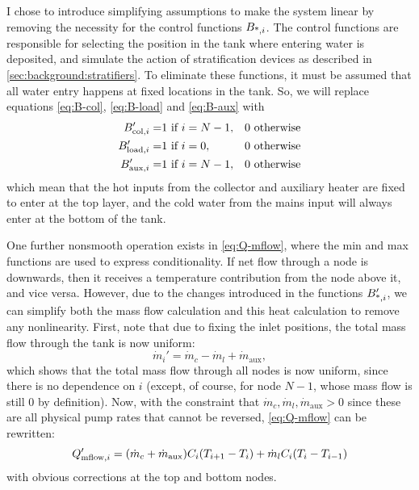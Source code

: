 I chose to introduce simplifying assumptions to make the system linear by removing the necessity for the control functions $B_{\text{*}, i}$.
The control functions are responsible for selecting the position in the tank where entering water is deposited, and simulate the action of stratification devices as described in \autoref{sec:background:stratifiers}.
To eliminate these functions, it must be assumed that all water entry happens at fixed locations in the tank.
So, we will replace equations \ref{eq:B-col}, \ref{eq:B-load} and \ref{eq:B-aux} with
\begin{eqnarray}
   \label{eq:B-col'}  B_{\text{col}, i}'  =& 1 \text{ if } i = N-1, & 0 \text{ otherwise} \\
   \label{eq:B-load'} B_{\text{load}, i}' =& 1 \text{ if } i = 0,   & 0 \text{ otherwise} \\
   \label{eq:B-aux'}  B_{\text{aux}, i}'  =& 1 \text{ if } i = N-1, & 0 \text{ otherwise}
\end{eqnarray}
which mean that the hot inputs from the collector and auxiliary heater are fixed to enter at the top layer, and the cold water from the mains input will always enter at the bottom of the tank.

One further nonsmooth operation exists in \autoref{eq:Q-mflow}, where the min and max functions are used to express conditionality.
If net flow through a node is downwards, then it receives a temperature contribution from the node above it, and vice versa.
However, due to the changes introduced in the functions $B_{\text{*}, i}'$, we can simplify both the mass flow calculation and this heat calculation to remove any nonlinearity.
First, note that due to fixing the inlet positions, the total mass flow through the tank is now uniform:
\begin{equation}
   \label{eq:mdot'}
   \dot{m}_i' = \dot{m}_c - \dot{m}_l + \dot{m}_{\text{aux}},
\end{equation}
which shows that the total mass flow through all nodes is now uniform, since there is no dependence on $i$ (except, of course, for node $N-1$, whose mass flow is still 0 by definition).
Now, with the constraint that $\dot{m}_c, \dot{m}_l, \dot{m}_{\text{aux}} > 0$ since these are all physical pump rates that cannot be reversed, \autoref{eq:Q-mflow} can be rewritten:
\begin{equation}
   Q_{\text{mflow}, i}' =  (\dot{m}_c + \dot{m}_{\text{aux}}) C_i (T_{i+1} - T_i)
               +  \dot{m}_l                         C_i (T_i - T_{i-1})
\end{equation}
with obvious corrections at the top and bottom nodes.


